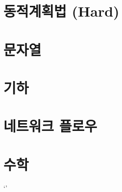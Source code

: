 \documentclass[openright, twoside, british]{book}
\begin{document}
\part{동적계획법 (Hard)}

    
\part{문자열}


\part{기하}


\part{네트워크 플로우}


\part{수학}


\appendix`'

\end{document}
